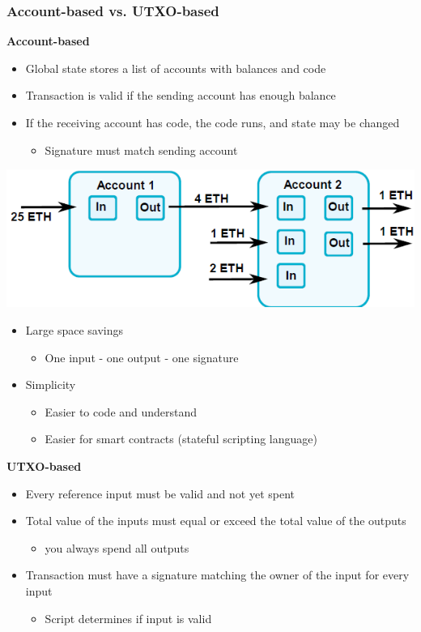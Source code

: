 \subsubsection{Account-based vs. UTXO-based}
\textbf{Account-based}
\begin{itemize}
    \item Global state stores a list of accounts with balances and code
    \item Transaction is valid if the sending account has enough balance
    \item If the receiving account has code, the code runs, and state may be changed
    \begin{itemize}
        \item Signature must match sending account
    \end{itemize}
\end{itemize}
\includegraphics[width=0.6\linewidth]{img/account-based.png}
\begin{itemize}
    \item Large space savings
    \begin{itemize}
        \item One input - one output - one signature
    \end{itemize}
    \item Simplicity
    \begin{itemize}
        \item Easier to code and understand
        \item Easier for smart contracts (stateful scripting language)
    \end{itemize}
\end{itemize}
\textbf{UTXO-based}
\begin{itemize}
    \item Every reference input must be valid and not yet spent
    \item Total value of the inputs must equal or exceed the total value of the outputs
    \begin{itemize}
        \item you always spend all outputs
    \end{itemize}
    \item Transaction must have a signature matching the owner of the input for every input
    \begin{itemize}
        \item Script determines if input is valid
    \end{itemize}
\end{itemize}
